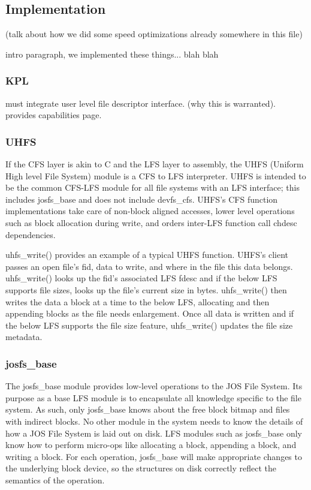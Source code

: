 \subsection{Implementation}
\label{sec:solution:impl}

(talk about how we did some speed optimizations already somewhere in this file)

intro paragraph, we implemented these things... blah blah

\subsubsection{KPL}

must integrate user level file descriptor interface. (why this is
warranted). provides capabilities page.

\subsubsection{UHFS}
\label{sec:solution:impl:uhfs}

If the CFS layer is akin to C and the LFS layer to assembly, the UHFS (Uniform
High level File System) module is a CFS to LFS interpreter. UHFS is intended to
be the common CFS-LFS module for all file systems with an LFS interface; this
includes josfs\_base and does not include devfs\_cfs. UHFS's CFS function
implementations take care of non-block aligned accesses, lower level operations
such as block allocation during write, and orders inter-LFS function call chdesc
dependencies.

uhfs\_write() provides an example of a typical UHFS function. UHFS's client
passes an open file's fid, data to write, and where in the file this data
belongs. uhfs\_write() looks up the fid's associated LFS fdesc and if the below
LFS supports file sizes, looks up the file's current size in bytes.
uhfs\_write() then writes the data a block at a time to the below LFS,
allocating and then appending blocks as the file needs enlargement. Once all
data is written and if the below LFS supports the file size feature,
uhfs\_write() updates the file size metadata.

\subsubsection{josfs\_base}

The josfs\_base module provides low-level operations to the JOS File System.
Its purpose as a base LFS module is to encapsulate all knowledge specific to the
file system. As such, only josfs\_base knows about the free block bitmap and
files with indirect blocks. No other module in the system needs to know the
details of how a JOS File System is laid out on disk. LFS modules such as
josfs\_base only know how to perform micro-ops like allocating a block,
appending a block, and writing a block. For each operation, josfs\_base will
make appropriate changes to the underlying block device, so the structures on
disk correctly reflect the semantics of the operation.

